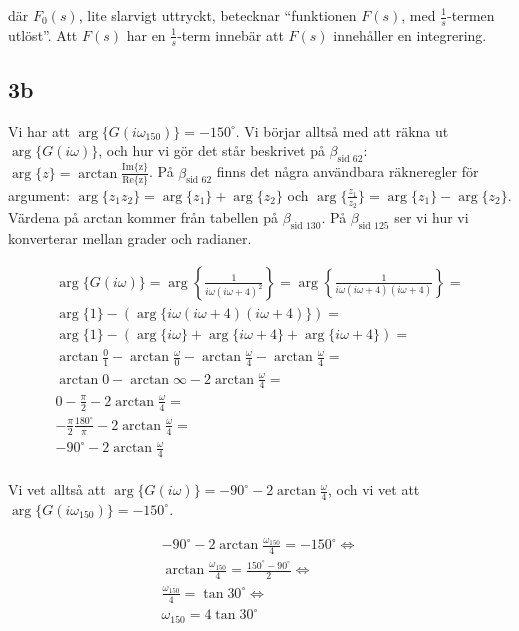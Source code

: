 \documentclass[a4paper]{article}
\newcommand{\mhb}[1]{$\beta_{\text{#1}}$}     %
\begin{document}
där $F_0(s)$, lite slarvigt uttryckt, betecknar ``funktionen $F(s)$, med $\frac{1}{s}$-termen utlöst''. Att $F(s)$ har en $\frac{1}{s}$-term innebär att $F(s)$ innehåller en integrering.


\subsection{3b}
Vi har att $\arg\{ G(i\omega_{150}) \} = -150^\circ$. Vi börjar alltså med att räkna ut $\arg \{ G(i\omega) \}$, och hur vi gör det står beskrivet på \mhb{sid 62}: $\arg\{z\} = \arctan{\frac{\text{Im\{z\}}}{\text{Re\{z\}}}}$. På \mhb{sid 62} finns det några användbara räkneregler för argument: $\arg\{ z_1 z_2 \} = \arg \{z_1\} + \arg \{z_2\}$ och $\arg\{ \frac{z_1}{z_2} \} = \arg\{ z_1 \} - \arg\{ z_2 \}$. Värdena på arctan kommer från tabellen på \mhb{sid 130}. På \mhb{sid 125} ser vi hur vi konverterar mellan grader och radianer.

\begin{align*}
  \arg\{ G(i\omega) \} = \arg \left \{ \frac{1}{i\omega(i\omega + 4)^2} \right \} =
  \arg \left \{ \frac{1}{i\omega(i\omega + 4)(i\omega + 4)} \right \} =\\
  \arg \{ 1 \} -(\arg\{ i\omega(i\omega + 4)(i\omega + 4) \}) =\\
  \arg \{ 1 \} -(\arg\{ i\omega\} + \arg\{ i\omega + 4 \} + \arg\{ i\omega + 4\}) =\\
  \arctan\frac{0}{1} - \arctan \frac{\omega}{0} -\arctan\frac{\omega}{4} -\arctan\frac{\omega}{4} =\\
  \arctan 0 - \arctan \infty -2\arctan\frac{\omega}{4} =\\
  0 -\frac{\pi}{2} -2\arctan\frac{\omega}{4} =\\
  -\frac{\pi}{2}\frac{180^\circ}{\pi} -2\arctan\frac{\omega}{4} =\\
  -90^\circ -2\arctan\frac{\omega}{4}\\
\end{align*}

Vi vet alltså att $\arg \{ G(i\omega) \} = -90^\circ -2\arctan\frac{\omega}{4}$, och vi vet att $\arg\{ G(i\omega_{150}) \} = -150^\circ$.

\begin{align*}
  -90^\circ -2\arctan\frac{\omega_{150}}{4} = -150^\circ \Longleftrightarrow\\
  \arctan\frac{\omega_{150}}{4} = \frac{150^\circ - 90^\circ}{2} \Longleftrightarrow\\
  \frac{\omega_{150}}{4} = \tan 30^\circ \Longleftrightarrow\\
  \omega_{150} = 4\tan 30^\circ
\end{align*}
\end{document}
